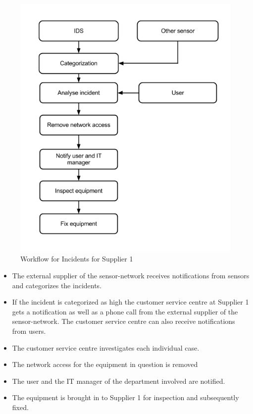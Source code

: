 \begin{figure}[H]
\begin{center}
\includegraphics[scale=0.57]{WorkflowCaseBSupplier1.png}
\caption[Workflow for Incidents, Case B Supplier 1]{Workflow for Incidents for Supplier 1}
\label{fig:WorkflowCaseBSupplier1}
\end{center}
\end{figure}

\begin{itemize}
\item The external supplier of the sensor-network receives notifications from sensors and categorizes the incidents.
\item If the incident is categorized as high the customer service centre at Supplier 1 gets a notification as well as a phone call from the external supplier of the sensor-network. The customer service centre can also receive notifications from users.
\item The customer service centre investigates each individual case.
\item The network access for the equipment in question is removed 
\item The user and the IT manager of the department involved are notified.
\item The equipment is brought in to Supplier 1 for inspection and subsequently fixed.
\end{itemize}

